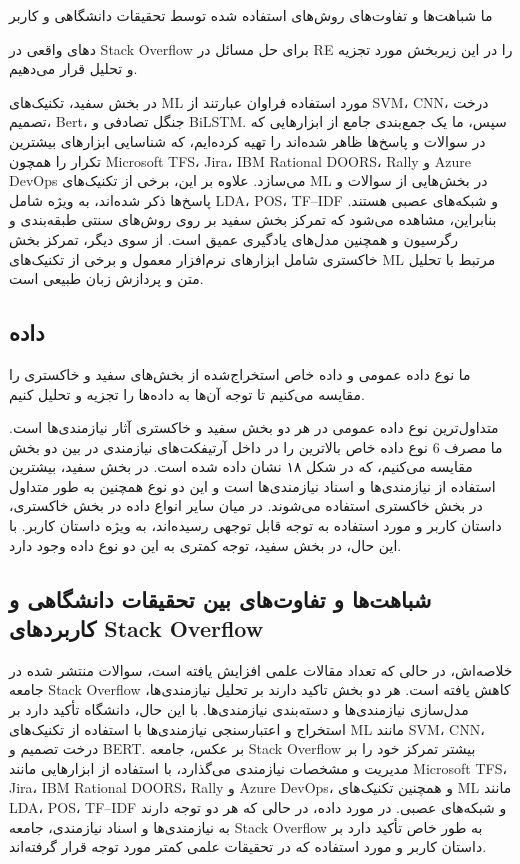 \documentclass[a4paper,10pt]{article}
\begin{document}
                ما شباهت‌ها و تفاوت‌های روش‌های استفاده شده توسط تحقیقات دانشگاهی و کاربر

                دهای واقعی در Stack Overflow برای حل مسائل در RE را در این زیربخش مورد تجزیه و تحلیل قرار می‌دهیم.

                در بخش سفید، تکنیک‌های ML مورد استفاده فراوان عبارتند از SVM، CNN، درخت تصمیم، Bert، جنگل تصادفی و BiLSTM. سپس، ما یک جمع‌بندی جامع از ابزارهایی که در سوالات و پاسخ‌ها ظاهر شده‌اند را تهیه کرده‌ایم، که شناسایی ابزارهای بیشترین تکرار را همچون Microsoft TFS، Jira، IBM Rational DOORS، Rally و Azure DevOps می‌سازد. علاوه بر این، برخی از تکنیک‌های ML در بخش‌هایی از سوالات و پاسخ‌ها ذکر شده‌اند، به ویژه شامل LDA، POS، TF–IDF و شبکه‌های عصبی هستند. بنابراین، مشاهده می‌شود که تمرکز بخش سفید بر روی روش‌های سنتی طبقه‌بندی و رگرسیون و همچنین مدل‌های یادگیری عمیق است. از سوی دیگر، تمرکز بخش خاکستری شامل ابزارهای نرم‌افزار معمول و برخی از تکنیک‌های ML مرتبط با تحلیل متن و پردازش زبان طبیعی است.

        \subsection{داده}

            ما نوع داده عمومی و داده خاص استخراج‌شده از بخش‌های سفید و خاکستری را مقایسه می‌کنیم تا توجه آن‌ها به داده‌ها را تجزیه و تحلیل کنیم.

            متداول‌ترین نوع داده عمومی در هر دو بخش سفید و خاکستری آثار نیازمندی‌ها است. ما مصرف 6 نوع داده خاص بالاترین را در داخل آرتیفکت‌های نیازمندی در بین دو بخش مقایسه می‌کنیم، که در شکل ۱۸ نشان داده شده است. در بخش سفید، بیشترین استفاده از نیازمندی‌ها و اسناد نیازمندی‌ها است و این دو نوع همچنین به طور متداول در بخش خاکستری استفاده می‌شوند. در میان سایر انواع داده در بخش خاکستری، داستان کاربر و مورد استفاده به توجه قابل توجهی رسیده‌اند، به ویژه داستان کاربر. با این حال، در بخش سفید، توجه کمتری به این دو نوع داده وجود دارد.
            

        \subsection{شباهت‌ها و تفاوت‌های بین تحقیقات دانشگاهی و کاربردهای Stack Overflow}

            خلاصه‌اش، در حالی که تعداد مقالات علمی افزایش یافته است، سوالات منتشر شده در جامعه Stack Overflow کاهش یافته است. هر دو بخش تاکید دارند بر تحلیل نیازمندی‌ها، مدل‌سازی نیازمندی‌ها و دسته‌بندی نیازمندی‌ها. با این حال، دانشگاه تأکید دارد بر استخراج و اعتبارسنجی نیازمندی‌ها با استفاده از تکنیک‌های ML مانند SVM، CNN، درخت تصمیم و BERT. بر عکس، جامعه Stack Overflow بیشتر تمرکز خود را بر مدیریت و مشخصات نیازمندی می‌گذارد، با استفاده از ابزارهایی مانند Microsoft TFS، Jira، IBM Rational DOORS، Rally و Azure DevOps، و همچنین تکنیک‌های ML مانند LDA، POS، TF–IDF و شبکه‌های عصبی. در مورد داده، در حالی که هر دو توجه دارند به نیازمندی‌ها و اسناد نیازمندی، جامعه Stack Overflow به طور خاص تأکید دارد بر داستان کاربر و مورد استفاده که در تحقیقات علمی کمتر مورد توجه قرار گرفته‌اند.
\end{document}
